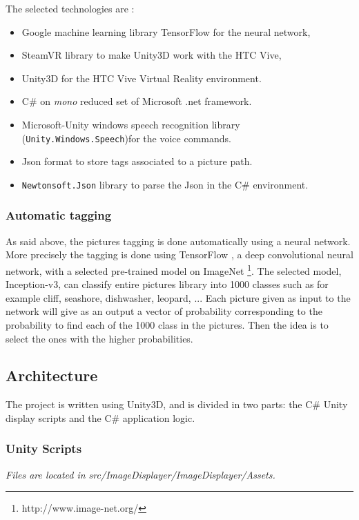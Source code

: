 \documentclass[11pt,a4paper]{article}
\begin{document}
The selected technologies are :
\begin{itemize}
	\item Google machine learning library TensorFlow for the neural network,
	\item SteamVR library to make Unity3D work with the HTC Vive,
	\item Unity3D for the HTC Vive Virtual Reality environment.
	\item C$\#$ on \textit{mono} reduced set of Microsoft .net framework.
	\item Microsoft-Unity windows speech recognition library (\texttt{Unity.Windows.Speech})for the voice commands.
	\item Json format to store tags associated to a picture path.
	\item \texttt{Newtonsoft.Json} library to parse the Json in the C$\#$ environment.
\end{itemize}

\subsubsection{Automatic tagging} 

As said above, the pictures tagging is done automatically using a neural network. More precisely the tagging is done using TensorFlow \cite{abadi2016tensorflow}, a deep convolutional neural network, with a selected pre-trained model on ImageNet \footnote{http://www.image-net.org/}. The selected model, Inception-v3, can classify entire pictures library into 1000 classes such as for example cliff, seashore, dishwasher, leopard, ... Each picture given as input to the network will give as an output a vector of probability corresponding to the probability to find each of the 1000 class in the pictures. Then the idea is to select the ones with the higher probabilities.


\subsection{Architecture}


The project is written using Unity3D, and is divided in two parts: the C$\#$ Unity display scripts and the C$\#$ application logic.

\subsubsection{Unity Scripts}
\textit{Files are located in src/ImageDisplayer/ImageDisplayer/Assets.}
\end{document}
